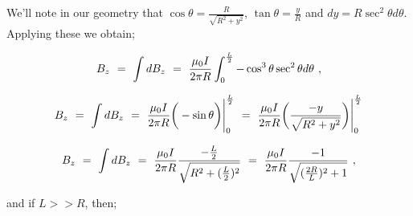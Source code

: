 \documentclass{article}
\begin{document}
We'll note in our geometry that \begin{math} \cos{\theta} = \frac{R}{\sqrt{R^2 + y^2}} \end{math}, \begin{math} \tan{\theta} = \frac{y}{R} \end{math} and \begin{math} dy = R \sec^{2}{\theta}d\theta \end{math}. Applying these we obtain;

\begin{equation} \label{eq:51}
B_z \hspace{0.125cm} = \hspace{0.125cm} \int d B_z \hspace{0.125cm} = \hspace{0.125cm} \frac{\mu_{0} I}{2 \pi R} \int_{0}^{\frac{L}{2}} - \cos^{3}\theta \sec^{2}\theta d \theta \hspace{0.125cm} ,
\end{equation}

\begin{equation} \label{eq:51}
B_z \hspace{0.125cm} = \hspace{0.125cm} \int d B_z \hspace{0.125cm} = \hspace{0.125cm} \frac{\mu_{0} I}{2 \pi R} \bigg( - \sin \theta \bigg) \Bigg|_{0}^{\frac{L}{2}} \hspace{0.125cm} = \hspace{0.125cm} \frac{\mu_{0} I}{2 \pi R} \bigg( \frac{-y}{\sqrt{R^2 + y^2}} \bigg) \Bigg|_{0}^{\frac{L}{2}}
\end{equation}

\begin{equation} \label{eq:51}
B_z \hspace{0.125cm} = \hspace{0.125cm} \int d B_z \hspace{0.125cm} = \hspace{0.125cm} \frac{\mu_{0} I}{2 \pi R} \frac{- \frac{L}{2}}{\sqrt{R^2 + (\frac{L}{2})^2}} \hspace{0.125cm} = \hspace{0.125cm} \frac{\mu_{0} I}{2 \pi R} \frac{-1}{\sqrt{(\frac{2R}{L})^2 + 1}} \hspace{0.125cm} ,
\end{equation}

and if \begin{math} L >> R \end{math}, then;
\end{document}

